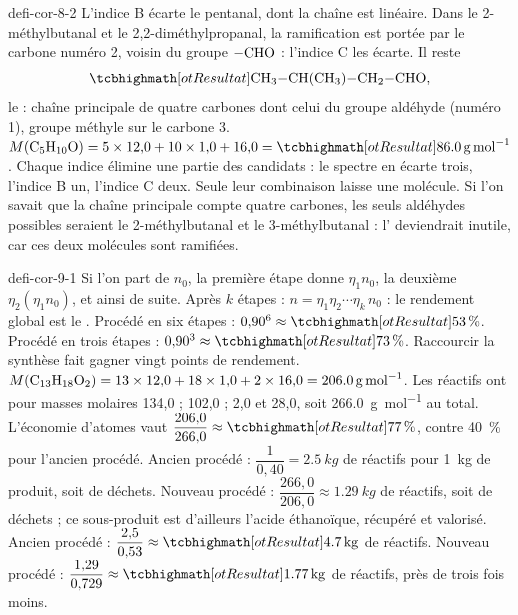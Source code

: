 \begin{blocEdition}{defi-cor-8-2}
L'indice B écarte le pentanal, dont la chaîne est linéaire. Dans le 2-méthylbutanal et le 2,2-diméthylpropanal, la
ramification est portée par le carbone numéro 2, voisin du groupe $\ce{-CHO}$ : l'indice C les écarte. Il reste
\[\res{\ce{CH3-CH(CH3)-CH2-CHO}},\]
le  : chaîne principale de quatre carbones dont celui du groupe aldéhyde (numéro 1), groupe méthyle sur le
carbone 3.
$M(\ce{C5H10O})=5\times12{,}0+10\times1{,}0+16{,}0=\res{\qty{86,0}{g.mol^{-1}}}$.
Chaque indice élimine une partie des candidats : le spectre en écarte trois, l'indice B un, l'indice C deux. Seule leur
combinaison laisse une molécule. Si l'on savait que la chaîne principale compte quatre carbones, les seuls aldéhydes
possibles seraient le 2-méthylbutanal et le 3-méthylbutanal : l' deviendrait inutile, car ces deux molécules
sont ramifiées.
\end{blocEdition}

\begin{blocEdition}{defi-cor-9-1}
Si l'on part de $n_0$, la première étape donne $\eta_1n_0$, la deuxième $\eta_2(\eta_1n_0)$, et ainsi de suite. Après $k$ étapes :
$n=\eta_1\eta_2\cdots\eta_k\,n_0$ : le rendement global est le .
Procédé en six étapes : $0{,}90^6\approx\res{\qty{53}{\percent}}$. Procédé en trois étapes : $0{,}90^3\approx\res{\qty{73}{\percent}}$. Raccourcir la synthèse fait gagner
vingt points de rendement.
$M(\ce{C13H18O2})=13\times12{,}0+18\times1{,}0+2\times16{,}0=\qty{206,0}{g.mol^{-1}}$. Les réactifs ont pour masses molaires 134,0 ; 102,0 ; 2,0 et
28,0, soit \qty{266,0}{g.mol^{-1}} au total. L'économie d'atomes vaut $\dfrac{206{,}0}{266{,}0}\approx\res{\qty{77}{\percent}}$, contre \qty{40}{\percent} pour l'ancien procédé.
Ancien procédé : $\dfrac{1}{0{,}40}=\qty{2,5}{kg}$ de réactifs pour \qty{1}{kg} de produit, soit  de déchets. Nouveau procédé :
$\dfrac{266{,}0}{206{,}0}\approx\qty{1,29}{kg}$ de réactifs, soit  de déchets ; ce sous-produit est d'ailleurs l'acide éthanoïque,
récupéré et valorisé.
Ancien procédé : $\dfrac{2{,}5}{0{,}53}\approx\res{\qty{4,7}{kg}}$ de réactifs. Nouveau procédé : $\dfrac{1{,}29}{0{,}729}\approx\res{\qty{1,77}{kg}}$ de réactifs, près de trois fois
moins.
\end{blocEdition}

